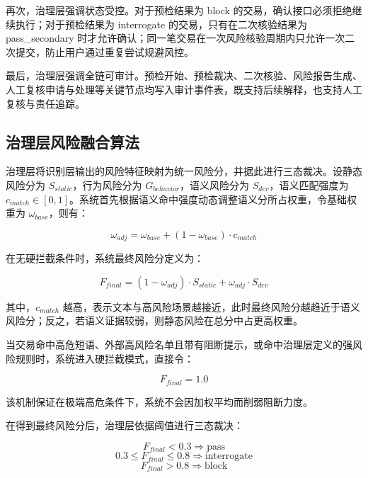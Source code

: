 \documentclass{xduugthesis}
\begin{document}
再次，治理层强调状态受控。对于预检结果为 block 的交易，确认接口必须拒绝继续执行；对于预检结果为 interrogate 的交易，只有在二次核验结果为 pass\_secondary 时才允许确认；同一笔交易在一次风险核验周期内只允许一次二次提交，防止用户通过重复尝试规避风控。

最后，治理层强调全链可审计。预检开始、预检裁决、二次核验、风险报告生成、人工复核申请与处理等关键节点均写入审计事件表，既支持后续解释，也支持人工复核与责任追踪。

\subsection{治理层风险融合算法}

治理层将识别层输出的风险特征映射为统一风险分，并据此进行三态裁决。设静态风险分为 $S_{static}$，行为风险分为 $G_{behavior}$，语义风险分为 $S_{dev}$，语义匹配强度为 $c_{match}\in [0,1]$。系统首先根据语义命中强度动态调整语义分所占权重，令基础权重为 $\omega_{base}$，则有：

\begin{equation}
\omega_{adj} = \omega_{base} + (1 - \omega_{base})\cdot c_{match}
\end{equation}

在无硬拦截条件时，系统最终风险分定义为：

\begin{equation}
F_{final} = (1 - \omega_{adj})\cdot S_{static} + \omega_{adj}\cdot S_{dev}
\end{equation}

其中，$c_{match}$ 越高，表示文本与高风险场景越接近，此时最终风险分越趋近于语义风险分；反之，若语义证据较弱，则静态风险在总分中占更高权重。

当交易命中高危短语、外部高风险名单且带有阻断提示，或命中治理层定义的强风险规则时，系统进入硬拦截模式，直接令：

\begin{equation}
F_{final} = 1.0
\end{equation}

该机制保证在极端高危条件下，系统不会因加权平均而削弱阻断力度。

在得到最终风险分后，治理层依据阈值进行三态裁决：

\begin{equation}
F_{final}<0.3\Rightarrow \mathrm{pass}
\end{equation}
\begin{equation}
0.3\leq F_{final}\leq 0.8\Rightarrow \mathrm{interrogate}
\end{equation}
\begin{equation}
F_{final}>0.8\Rightarrow \mathrm{block}
\end{equation}
\end{document}
